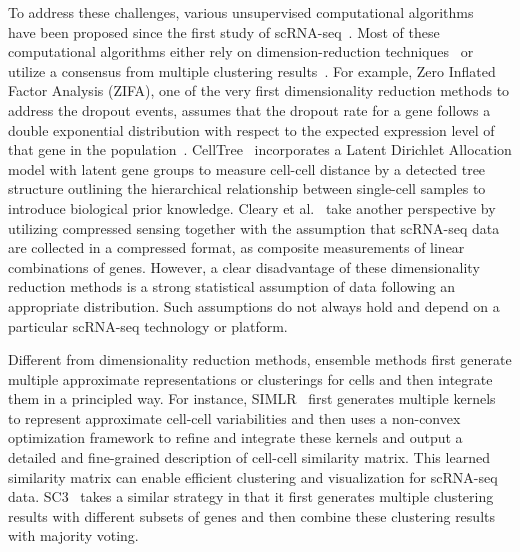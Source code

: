 \documentclass[5p]{elsarticle}
\newcommand{\rev}[1]{{\color{black}#1}}
\begin{document}
\rev{To} address these challenges, various unsupervised computational algorithms~\cite{wang2017visualization, pierson2015zifa, cleary2017efficient,kiselev2017sc3,butler2018integrating} have been proposed since the first study of scRNA-seq~\cite{tang2009mrna}. Most of these computational algorithms either rely on dimension-reduction techniques~\cite{pierson2015zifa,cleary2017efficient,butler2018integrating} or utilize a \rev{consensus} from multiple clustering results~\cite{wang2017visualization, kiselev2017sc3}. For example, Zero Inflated Factor Analysis (ZIFA), one of the very first \rev{dimensionality reduction} methods to address the dropout events,
assumes that the dropout rate for a gene follows a double exponential distribution with respect to the expected expression level of that gene in the population~\cite{pierson2015zifa}. CellTree~\cite{yotsukura2016celltree} incorporates a Latent Dirichlet Allocation model with latent gene groups to measure \rev{cell-cell} distance by a detected tree structure outlining the hierarchical relationship between single-cell samples to introduce biological prior knowledge. \rev{Cleary et al.~\cite{cleary2017efficient} take} another perspective by utilizing compressed sensing together with \rev{the assumption} that scRNA-seq data \rev{are collected} in a compressed format, as composite measurements of linear combinations of genes. However, \rev{a clear disadvantage} of these \rev{dimensionality reduction methods} is \rev{a strong statistical assumption of data following an appropriate distribution.} \rev{Such assumptions do not always} hold \rev{and depend on a particular scRNA-seq technology or platform.}

\rev{Different} from \rev{dimensionality reduction} methods, \rev{ensemble methods first} generate multiple approximate representations or clusterings for cells and then integrate them in a principled way. For instance, SIMLR~\cite{wang2017visualization} first generates multiple kernels to represent approximate \rev{cell-cell} variabilities and then uses a non-convex optimization framework to refine and integrate these kernels and output a detailed and fine-grained description of \rev{cell-cell} similarity matrix. This learned similarity matrix can enable efficient clustering and visualization for scRNA-seq data. SC3~\cite{kiselev2017sc3} takes a similar strategy in that it first generates multiple clustering results with different subsets of genes and then combine these clustering results with majority voting. 
\end{document}

